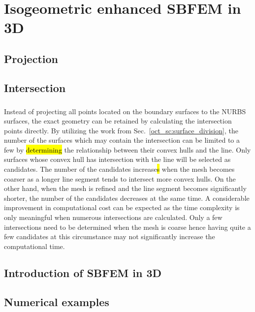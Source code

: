
\chapter{Isogeometric enhanced SBFEM in 3D}


\section{Projection}




\section{Intersection}
\paragraph{}
Instead of projecting all points located on the boundary surfaces to the NURBS surfaces, the exact geometry can be retained by calculating the intersection points directly.
By utilizing the work from Sec.~\ref{oct_sc:surface_division}, the number of the surfaces which may contain the intersection can be limited to a few by \hl{determining} the relationship between their convex hulls and the line.
Only surfaces whose convex hull has intersection with the line will be selected as candidates.
The number of the candidates increase\hl{s} when the mesh becomes coarser as a longer line segment tends to intersect more convex hulls.
On the other hand, when the mesh is refined and the line segment becomes significantly shorter, the number of the candidates decreases at the same time.
A considerable improvement in computational cost can be expected as the time complexity is only meaningful when numerous intersections are calculated.
Only a few intersections need to be determined when the mesh is coarse hence having quite a few candidates at this circumstance may not significantly increase the computational time.




\section{Introduction of SBFEM in 3D}


\section{Numerical examples}





